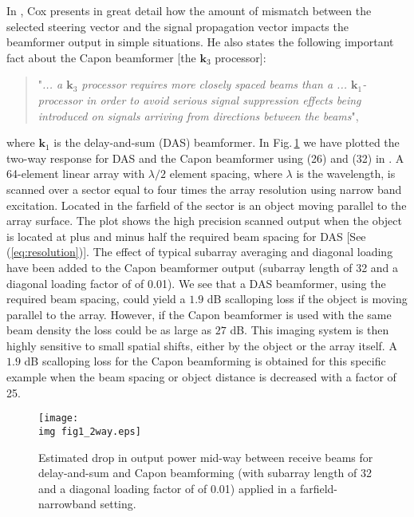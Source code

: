 \documentclass[draftcls]{IEEEtran}
\newcommand{\mat}[1]{\mathbf{#1}}
\renewcommand{\vec}[1]{\mathbf{#1}}
\newcommand{\img}{img/}
\begin{document}
In \cite{Cox1973}, Cox presents in great detail how the amount of mismatch between the selected steering vector and the signal propagation vector impacts the beamformer output in simple situations. He also states the following important fact about the Capon beamformer [the $\vec{k}_3$ processor]: 
\begin{quote}
"\textit{... a $\vec{k}_3$ processor requires more closely spaced beams than a ... $\vec{k}_1$-processor in order to avoid serious signal suppression effects being introduced on signals arriving from directions between the beams}", 
\end{quote}
where $\vec{k}_1$ is the delay-and-sum (DAS) beamformer. In Fig.\,\ref{fig:das_capon_beams} we have plotted the two-way response for DAS and the Capon beamformer using (26) and (32) in \cite{Cox1973}. A 64-element linear array with $\lambda/2$ element spacing, where $\lambda$ is the wavelength, is scanned over a sector equal to four times the array resolution using narrow band excitation. Located in the farfield of the sector is an object moving parallel to the array surface. The plot shows the high precision scanned output when the object is located at plus and minus half the required beam spacing for DAS [See (\ref{eq:resolution})]. %
The effect of typical subarray averaging and diagonal loading have been added to the Capon beamformer output (subarray length of 32 and a diagonal loading factor of of 0.01). We see that a DAS beamformer, using the required beam spacing, could yield a $1.9$ dB scalloping loss \cite{Harris1978} if the object is moving parallel to the array. However, if the Capon beamformer is used with the same beam density the loss could be as large as $27$ dB. This imaging system is then highly sensitive to small spatial shifts, either by the object or the array itself. A $1.9$ dB scalloping loss for the Capon beamforming is obtained for this specific example when the beam spacing or object distance is decreased with a factor of 25. 

\begin{figure}[!t]
\centerline{
\texttt{[image: \\img fig1\_2way.eps]}
}
\caption{Estimated drop in output power mid-way between receive beams for delay-and-sum and Capon beamforming (with subarray length of 32 and a diagonal loading factor of of 0.01) applied in a farfield-narrowband setting. %
}
\label{fig:das_capon_beams}
\end{figure}
\end{document}
